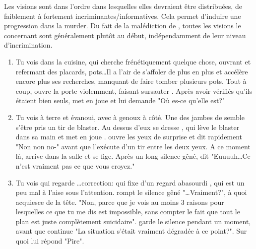 {	\par Les visions sont dans l'ordre dans lesquelles elles devraient être distribuées, de faiblement à fortement incriminantes/informatives. Cela permet d'induire une progression dans la murder. Du fait de la malédiction de \nmPlayerXI, toutes les visions le concernant sont généralement plutôt au début, indépendamment de leur niveau d'incrimination.
	
	\begin{enumerate}
		\item Tu vois \nmPlayerII dans la cuisine, qui cherche frénétiquement quelque chose, ouvrant et refermant des placards, pots\dots Il a l'air de s'affoler de plus en plus et accélère encore plus ses recherches, manquant de faire tomber plusieurs pots. Tout à coup, \nmPlayerVIII ouvre la porte violemment, faisant sursauter \nmPlayerII. Après avoir vérifiés qu'ils étaient bien seuls, \nmPlayerVIII met en joue \nmPlayerII et lui demande "Où es-ce qu'elle est?"
		
		\item Tu vois \nmPlayerII à terre et évanoui, avec \nmPlayerI à genoux à côté. Une des jambes de \nmPlayerI semble s'être pris un tir de blaster. Au dessus d'eux se dresse \nmPlayerXI, qui lève le blaster dans sa main et met en joue \nmPlayerI. \nmPlayerI ouvre les yeux de surprise et dit rapidement "Non non no-" avant que \nmPlayerXI l'exécute d'un tir entre les deux yeux. A ce moment là, \nmPlayerVII arrive dans la salle et \nmPlayerXI se fige. Après un long silence gêné, \nmPlayerVII dit "Euuuuh\dots Ce n'est vraiment pas ce que vous croyez."
		
		\item Tu vois \nmPlayerVII qui regarde \nmPlayerV\dots correction: qui fixe d'un regard abasourdi \nmPlayerV, qui est un peu mal à l'aise sous l'attention. \nmPlayerVII rompt le silence gêné "\dots Vraiment?", à quoi \nmPlayerV acquiesce de la tête. "Non, parce que je vois au moins 3 raisons pour lesquelles ce que tu me dis est impossible, sans compter le fait que tout le plan est juste complètement suicidaire". \nmPlayerV garde le silence pendant un moment, avant que \nmPlayerVII continue "La situation s'était vraiment dégradée à ce point?". Sur quoi \nmPlayerV lui répond "Pire".
		

\end{enumerate}}
